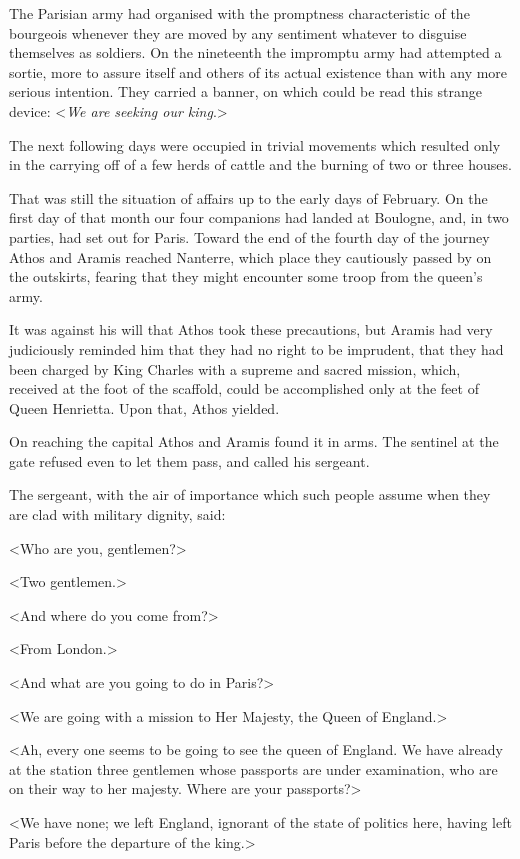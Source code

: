 The Parisian army had organised with the promptness characteristic of the bourgeois whenever they are moved by any sentiment whatever to disguise themselves as soldiers. On the nineteenth the impromptu army had attempted a sortie, more to assure itself and others of its actual existence than with any more serious intention. They carried a banner, on which could be read this strange device: <\textit{We are seeking our king}.>

The next following days were occupied in trivial movements which resulted only in the carrying off of a few herds of cattle and the burning of two or three houses.

That was still the situation of affairs up to the early days of February. On the first day of that month our four companions had landed at Boulogne, and, in two parties, had set out for Paris. Toward the end of the fourth day of the journey Athos and Aramis reached Nanterre, which place they cautiously passed by on the outskirts, fearing that they might encounter some troop from the queen's army.

It was against his will that Athos took these precautions, but Aramis had very judiciously reminded him that they had no right to be imprudent, that they had been charged by King Charles with a supreme and sacred mission, which, received at the foot of the scaffold, could be accomplished only at the feet of Queen Henrietta. Upon that, Athos yielded.

On reaching the capital Athos and Aramis found it in arms. The sentinel at the gate refused even to let them pass, and called his sergeant.

The sergeant, with the air of importance which such people assume when they are clad with military dignity, said:

<Who are you, gentlemen?>

<Two gentlemen.>

<And where do you come from?>

<From London.>

<And what are you going to do in Paris?>

<We are going with a mission to Her Majesty, the Queen of England.>

<Ah, every one seems to be going to see the queen of England. We have already at the station three gentlemen whose passports are under examination, who are on their way to her majesty. Where are your passports?>

<We have none; we left England, ignorant of the state of politics here, having left Paris before the departure of the king.>

